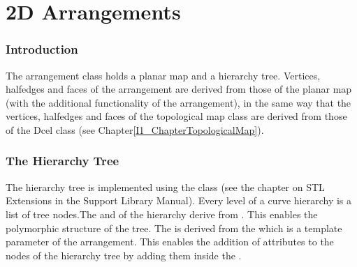 



\chapter{2D Arrangements}


\subsection*{Introduction}

The arrangement class holds a planar map and a hierarchy tree.
Vertices, halfedges and faces of the arrangement are derived from
those of the planar map (with the additional functionality of
the arrangement), in the same way that the vertices, halfedges and faces 
of the topological map class are derived from those of the Dcel class
(see Chapter\ref{I1_ChapterTopologicalMap}).

\subsection*{The Hierarchy Tree}

The hierarchy tree is implemented using the 
class (see the chapter on STL Extensions in the Support Library Manual). 
Every level of a curve
hierarchy is a list of tree nodes.The  and 
 of 
the hierarchy derive from . This enables the
polymorphic structure of the tree. The  is
derived from the  which is a template parameter
of the arrangement. This enables the addition of attributes to the nodes
of the hierarchy tree by adding them inside the .

